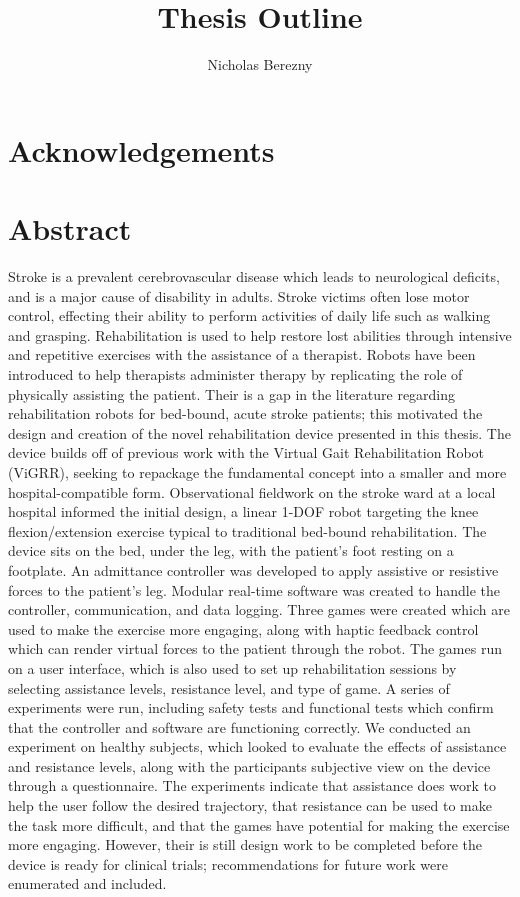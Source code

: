 \documentclass[12pt]{report}
\author{Nicholas Berezny}
\title{Thesis Outline}
\begin{document}
\maketitle
\newpage

\chapter*{Acknowledgements}
\chapter*{Abstract}

Stroke is a prevalent cerebrovascular disease which leads to neurological deficits, and is a major cause of disability in adults. Stroke victims often lose motor control, effecting their ability to perform activities of daily life such as walking and grasping. Rehabilitation is used to help restore lost abilities through intensive and repetitive exercises with the assistance of a therapist. Robots have been introduced to help therapists administer therapy by replicating the role of physically assisting the patient. Their is a gap in the literature regarding rehabilitation robots for bed-bound, acute stroke patients; this motivated the design and creation of the novel rehabilitation device presented in this thesis. The device builds off of previous work with the Virtual Gait Rehabilitation Robot (ViGRR), seeking to repackage the fundamental concept into a smaller and more hospital-compatible form. Observational fieldwork on the stroke ward at a local hospital informed the initial design, a linear 1-DOF robot targeting the knee flexion/extension exercise typical to traditional bed-bound rehabilitation. The device sits on the bed, under the leg, with the patient's foot resting on a footplate. An admittance controller was developed to apply assistive or resistive forces to the patient's leg. Modular real-time software was created to handle the controller, communication, and data logging. Three games were created which are used to make the exercise more engaging, along with haptic feedback control which can render virtual forces to the patient through the robot. The games run on a user interface, which is also used to set up rehabilitation sessions by selecting assistance levels, resistance level, and type of game. 
	A series of experiments were run, including safety tests and functional tests which confirm that the controller and software are functioning correctly. We conducted an experiment on healthy subjects, which looked to evaluate the effects of assistance and resistance levels, along with the participants subjective view on the device through a questionnaire. The experiments indicate that assistance does work to help the user follow the desired trajectory, that resistance can be used to make the task more difficult, and that the games have potential for making the exercise more engaging. However, their is still design work to be completed before the device is ready for clinical trials; recommendations for future work were enumerated and included. 
	
\end{document}
